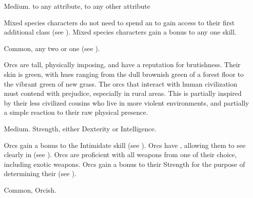    Medium.
    to any attribute,  to any other attribute
  \begin{raggeditemize}
     Mixed species characters do not need to spend an  to gain access to their first additional class (see ).
     Mixed species characters gain a  bonus to any one skill.
  \end{raggeditemize}
   Common, any two  or one  (see ).


  Orcs are tall, physically imposing, and have a reputation for brutishness.
  Their skin is green, with hues ranging from the dull brownish green of a forest floor to the vibrant green of new grass.
  The orcs that interact with human civilization must contend with prejudice, especially in rural areas.
  This is partially inspired by their less civilized cousins who live in more violent environments, and partially a simple reaction to their raw physical presence.

   Medium.
    Strength, either  Dexterity or  Intelligence.
  \begin{raggeditemize}
     Orcs gain a  bonus to the Intimidate skill (see ).
     Orcs have , allowing them to see clearly in  (see ).
     Orcs are proficient with all weapons from one  of their choice, including exotic weapons.
     Orcs gain a  bonus to their Strength for the purpose of determining their  (see ).
  \end{raggeditemize}
   Common, Orcish.
